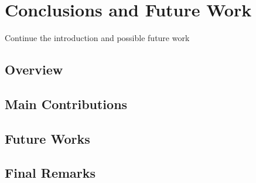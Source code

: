 \chapter{Conclusions and Future Work}
Continue the introduction and possible future work
\section{Overview}
\section{Main Contributions}
\section{Future Works}
\section{Final Remarks}